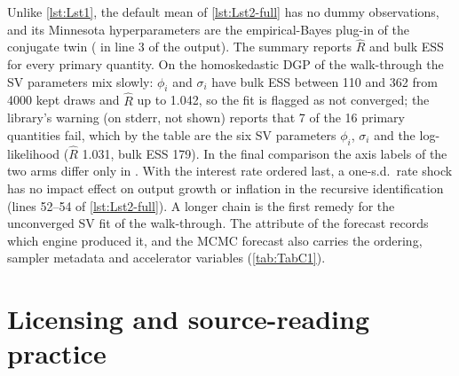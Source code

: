 Unlike \cref{lst:Lst1}, the default mean of \cref{lst:Lst2-full} has no dummy observations, and
its Minnesota hyperparameters are the empirical-Bayes plug-in of the conjugate twin
( in line 3 of the output).
The summary reports $\hat R$ and bulk ESS for every primary quantity.
On the homoskedastic DGP of the walk-through the SV parameters mix slowly: $\phi_i$ and $\sigma_i$
have bulk ESS between 110 and 362 from 4000 kept draws and $\hat R$ up to 1.042, so the fit is
flagged as not converged; the library's warning (on stderr, not shown) reports that 7 of the 16
primary quantities fail, which by the table are the six SV parameters $\phi_i$, $\sigma_i$ and the
log-likelihood ($\hat R$ 1.031, bulk ESS 179).
In the final comparison the axis labels of the two arms differ only in .
With the interest rate ordered last, a one-s.d.\ rate shock has no impact effect on output growth
or inflation in the recursive identification (lines 52--54 of \cref{lst:Lst2-full}).
A longer chain is the first remedy for the unconverged SV fit of the walk-through.
The  attribute of the forecast records which engine produced it, and the MCMC
forecast also carries the ordering, sampler metadata and accelerator variables
(\cref{tab:TabC1}).

\section{Licensing and source-reading practice}\label{app:licensing}

